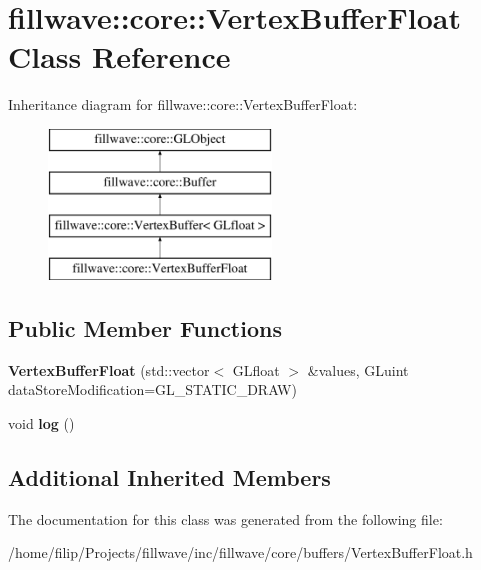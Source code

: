 \hypertarget{classfillwave_1_1core_1_1VertexBufferFloat}{}\section{fillwave\+:\+:core\+:\+:Vertex\+Buffer\+Float Class Reference}
\label{classfillwave_1_1core_1_1VertexBufferFloat}
Inheritance diagram for fillwave\+:\+:core\+:\+:Vertex\+Buffer\+Float\+:\begin{figure}[H]
\begin{center}
\leavevmode
\includegraphics[height=4.000000cm]{classfillwave_1_1core_1_1VertexBufferFloat}
\end{center}
\end{figure}
\subsection*{Public Member Functions}
\begin{DoxyCompactItemize}
\item 
\hypertarget{classfillwave_1_1core_1_1VertexBufferFloat_a86f182b8e08f008beda425a125badc73}{}{\bfseries Vertex\+Buffer\+Float} (std\+::vector$<$ G\+Lfloat $>$ \&values, G\+Luint data\+Store\+Modification=G\+L\+\_\+\+S\+T\+A\+T\+I\+C\+\_\+\+D\+R\+A\+W)\label{classfillwave_1_1core_1_1VertexBufferFloat_a86f182b8e08f008beda425a125badc73}

\item 
\hypertarget{classfillwave_1_1core_1_1VertexBufferFloat_abb62b2bd5a5b88f39855123ee7639b35}{}void {\bfseries log} ()\label{classfillwave_1_1core_1_1VertexBufferFloat_abb62b2bd5a5b88f39855123ee7639b35}

\end{DoxyCompactItemize}
\subsection*{Additional Inherited Members}


The documentation for this class was generated from the following file\+:\begin{DoxyCompactItemize}
\item 
/home/filip/\+Projects/fillwave/inc/fillwave/core/buffers/Vertex\+Buffer\+Float.\+h\end{DoxyCompactItemize}
